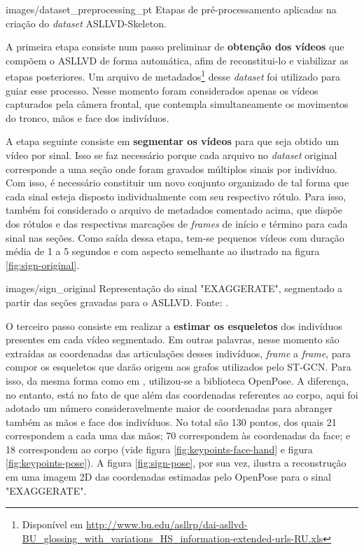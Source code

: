     {images/dataset_preprocessing_pt}
    {Etapas de pré-processamento aplicadas na criação do \textit{dataset} ASLLVD-Skeleton.}

A primeira etapa consiste num passo preliminar de \textbf{obtenção dos vídeos} que compõem o ASLLVD de forma automática, afim de reconstitui-lo e viabilizar as etapas posteriores. Um arquivo de metadados\footnote{
    Disponível em \url{http://www.bu.edu/asllrp/dai-asllvd-BU_glossing_with_variations_HS_information-extended-urls-RU.xls}
} desse \textit{dataset} foi utilizado para guiar esse processo. Nesse momento foram considerados apenas os vídeos capturados pela câmera frontal, que contempla simultaneamente os movimentos do tronco, mãos e face dos indivíduos.

A etapa seguinte consiste em \textbf{segmentar os vídeos} para que seja obtido um vídeo por sinal. Isso se faz necessário porque cada arquivo no \textit{dataset} original corresponde a uma seção onde foram gravados múltiplos sinais por indivíduo. Com isso, é necessário constituir um novo conjunto organizado de tal forma que cada sinal esteja disposto individualmente com seu respectivo rótulo. Para isso, também foi considerado o arquivo de metadados comentado acima, que dispõe dos rótulos e das respectivas marcações de \textit{frames} de início e término para cada sinal nas seções. Como saída dessa etapa, tem-se pequenos vídeos com duração média de 1 a 5 segundos e com aspecto semelhante ao ilustrado na figura \ref{fig:sign-original}.

    {images/sign_original}
    {Representação do sinal "EXAGGERATE", segmentado a partir das seções gravadas para o ASLLVD. Fonte: \cite{athitsos-asllvd-2008}.}

O terceiro passo consiste em realizar a \textbf{estimar os esqueletos} dos indivíduos presentes em cada vídeo segmentado. Em outras palavras, nesse momento são extraídas as coordenadas das articulações desses indivíduos, \textit{frame} a \textit{frame}, para compor os esqueletos que darão origem aos grafos utilizados pelo ST-GCN. Para isso, da mesma forma como em \cite{st-gcn-2018}, utilizou-se a biblioteca OpenPose. A diferença, no entanto, está no fato de que além das coordenadas referentes ao corpo, aqui foi adotado um número consideravelmente maior de coordenadas para abranger também as mãos e face dos indivíduos. No total são 130 pontos, dos quais 21 correspondem a cada uma das mãos; 70 correspondem às coordenadas da face; e 18 correspondem ao corpo (vide figura \ref{fig:keypoints-face-hand} e figura \ref{fig:keypoints-pose}). A figura \ref{fig:sign-pose}, por sua vez, ilustra a reconstrução em uma imagem 2D das coordenadas estimadas pelo OpenPose para o sinal "EXAGGERATE".


